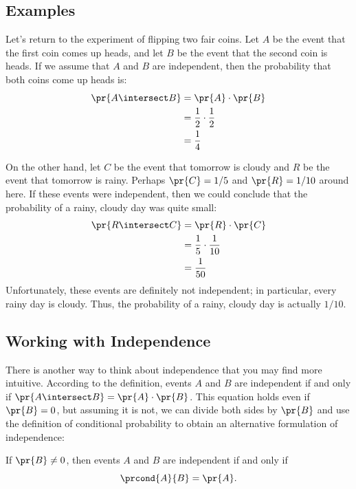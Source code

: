 \subsection{Examples}

Let's return to the experiment of flipping two fair coins.  Let $A$ be
the event that the first coin comes up heads, and let $B$ be the event
that the second coin is heads.  If we assume that $A$ and $B$ are
independent, then the probability that both coins come up heads is:
%
\begin{align*}
\pr{A \intersect B} & = \pr{A} \cdot \pr{B} \\
              & = \frac{1}{2} \cdot \frac{1}{2} \\
              & = \frac{1}{4}
\end{align*}

On the other hand, let $C$ be the event that tomorrow is cloudy and
$R$ be the event that tomorrow is rainy.  Perhaps $\pr{C} = 1/5$ and
$\pr{R} = 1/10$ around here.  If these events were independent, then
we could conclude that the probability of a rainy, cloudy day was
quite small:
%
\begin{align*}
\pr{R \intersect C} & = \pr{R} \cdot \pr{C} \\
              & = \frac{1}{5} \cdot \frac{1}{10} \\
              & = \frac{1}{50}
\end{align*}
%
Unfortunately, these events are definitely not independent; in
particular, every rainy day is cloudy.  Thus, the probability of a
rainy, cloudy day is actually $1/10$.

\subsection{Working with Independence}

There is another way to think about independence that you may find more
intuitive.  According to the definition, events $A$ and $B$ are
independent if and only if $\pr{A \intersect B} = \pr{A} \cdot \pr{B}$.  This
equation holds even if $\pr{B} = 0$, but assuming it is not, we can divide
both sides by $\pr{B}$ and use the definition of conditional probability
to obtain an alternative formulation of independence:
\begin{proposition*}
If $\pr{B} \neq 0$, then
events $A$ and $B$  are independent if and only if
\begin{equation}\label{LN12:ABA}
\prcond{A}{B} = \pr{A}.
\end{equation}
\end{proposition*}

